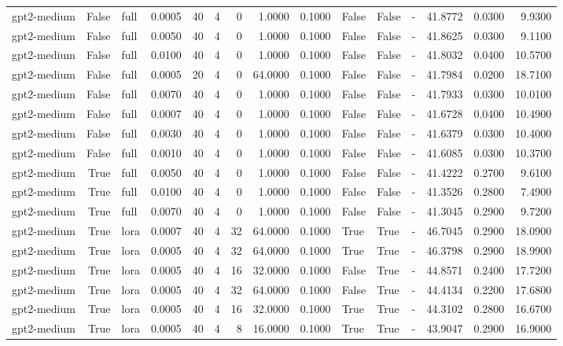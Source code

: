 \begin{tabular}{lrlrrrrrrlllrrr}
gpt2-medium & False & full & 0.0005 & 40 & 4 & 0 & 1.0000 & 0.1000 & False & False & - & 41.8772 & 0.0300 & 9.9300 \\
gpt2-medium & False & full & 0.0050 & 40 & 4 & 0 & 1.0000 & 0.1000 & False & False & - & 41.8625 & 0.0300 & 9.1100 \\
gpt2-medium & False & full & 0.0100 & 40 & 4 & 0 & 1.0000 & 0.1000 & False & False & - & 41.8032 & 0.0400 & 10.5700 \\
gpt2-medium & False & full & 0.0005 & 20 & 4 & 0 & 64.0000 & 0.1000 & False & False & - & 41.7984 & 0.0200 & 18.7100 \\
gpt2-medium & False & full & 0.0070 & 40 & 4 & 0 & 1.0000 & 0.1000 & False & False & - & 41.7933 & 0.0300 & 10.0100 \\
gpt2-medium & False & full & 0.0007 & 40 & 4 & 0 & 1.0000 & 0.1000 & False & False & - & 41.6728 & 0.0400 & 10.4900 \\
gpt2-medium & False & full & 0.0030 & 40 & 4 & 0 & 1.0000 & 0.1000 & False & False & - & 41.6379 & 0.0300 & 10.4000 \\
gpt2-medium & False & full & 0.0010 & 40 & 4 & 0 & 1.0000 & 0.1000 & False & False & - & 41.6085 & 0.0300 & 10.3700 \\
gpt2-medium & True & full & 0.0050 & 40 & 4 & 0 & 1.0000 & 0.1000 & False & False & - & 41.4222 & 0.2700 & 9.6100 \\
gpt2-medium & True & full & 0.0100 & 40 & 4 & 0 & 1.0000 & 0.1000 & False & False & - & 41.3526 & 0.2800 & 7.4900 \\
gpt2-medium & True & full & 0.0070 & 40 & 4 & 0 & 1.0000 & 0.1000 & False & False & - & 41.3045 & 0.2900 & 9.7200 \\
gpt2-medium & True & lora & 0.0007 & 40 & 4 & 32 & 64.0000 & 0.1000 & True & True & - & 46.7045 & 0.2900 & 18.0900 \\
gpt2-medium & True & lora & 0.0005 & 40 & 4 & 32 & 64.0000 & 0.1000 & True & True & - & 46.3798 & 0.2900 & 18.9900 \\
gpt2-medium & True & lora & 0.0005 & 40 & 4 & 16 & 32.0000 & 0.1000 & False & True & - & 44.8571 & 0.2400 & 17.7200 \\
gpt2-medium & True & lora & 0.0005 & 40 & 4 & 32 & 64.0000 & 0.1000 & False & True & - & 44.4134 & 0.2200 & 17.6800 \\
gpt2-medium & True & lora & 0.0005 & 40 & 4 & 16 & 32.0000 & 0.1000 & True & True & - & 44.3102 & 0.2800 & 16.6700 \\
gpt2-medium & True & lora & 0.0005 & 40 & 4 & 8 & 16.0000 & 0.1000 & True & True & - & 43.9047 & 0.2900 & 16.9000 \\

\end{tabular}
